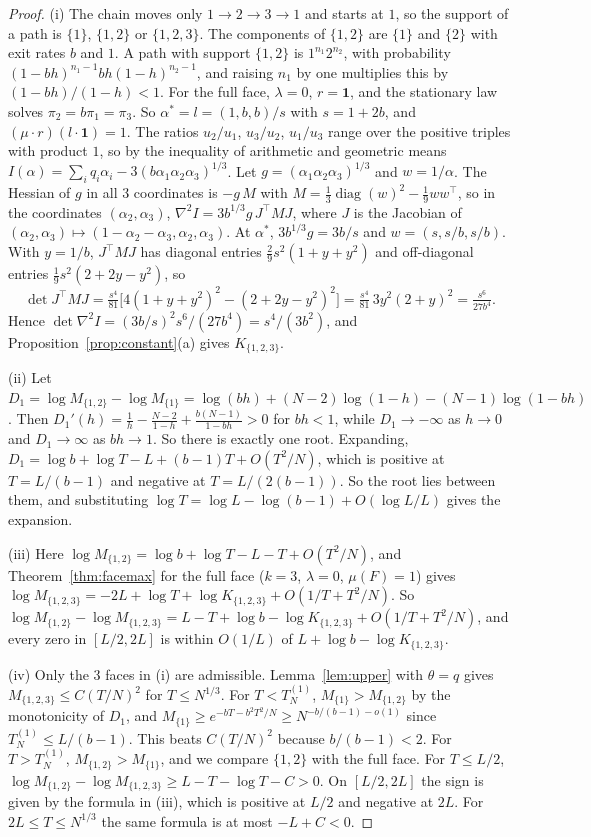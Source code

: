 \begin{proof}
(i) The chain moves only $1\to2\to3\to1$ and starts at $1$, so the support of
a path is $\{1\}$, $\{1,2\}$ or $\{1,2,3\}$. The components of $\{1,2\}$ are
$\{1\}$ and $\{2\}$ with exit rates $b$ and $1$. A path with support
$\{1,2\}$ is $1^{n_1}2^{n_2}$, with probability
$(1-bh)^{n_1-1}bh(1-h)^{n_2-1}$, and raising $n_1$ by one multiplies this by
$(1-bh)/(1-h)<1$. For the full face, $\lambda=0$, $r=\mathbf 1$, and the
stationary law solves $\pi_2=b\pi_1=\pi_3$. So $\alpha^*=l=(1,b,b)/s$ with
$s=1+2b$, and $(\mu\cdot r)(l\cdot\mathbf 1)=1$. The ratios $u_2/u_1$,
$u_3/u_2$, $u_1/u_3$ range over the positive triples with product $1$, so by
the inequality of arithmetic and geometric means
$I(\alpha)=\sum_iq_i\alpha_i-3(b\alpha_1\alpha_2\alpha_3)^{1/3}$. Let
$g=(\alpha_1\alpha_2\alpha_3)^{1/3}$ and $w=1/\alpha$. The Hessian of $g$ in
all 3 coordinates is $-g\,M$ with
$M=\frac13\operatorname{diag}(w)^2-\frac19ww^\top$, so in the coordinates
$(\alpha_2,\alpha_3)$, $\nabla^2I=3b^{1/3}g\,J^\top MJ$, where $J$ is the
Jacobian of $(\alpha_2,\alpha_3)\mapsto(1-\alpha_2-\alpha_3,\alpha_2,\alpha_3)$.
At $\alpha^*$, $3b^{1/3}g=3b/s$ and $w=(s,s/b,s/b)$. With $y=1/b$,
$J^\top MJ$ has diagonal entries $\frac29s^2(1+y+y^2)$ and off-diagonal
entries $\frac19s^2(2+2y-y^2)$, so
\[
\det J^\top MJ=\tfrac{s^4}{81}\bigl[4(1+y+y^2)^2-(2+2y-y^2)^2\bigr]
=\tfrac{s^4}{81}\,3y^2(2+y)^2=\tfrac{s^6}{27b^4}.
\]
Hence $\det\nabla^2I=(3b/s)^2s^6/(27b^4)=s^4/(3b^2)$, and
Proposition~\ref{prop:constant}(a) gives $K_{\{1,2,3\}}$.

(ii) Let $D_1=\log M_{\{1,2\}}-\log M_{\{1\}}
=\log(bh)+(N-2)\log(1-h)-(N-1)\log(1-bh)$. Then
$D_1'(h)=\frac1h-\frac{N-2}{1-h}+\frac{b(N-1)}{1-bh}>0$ for $bh<1$, while
$D_1\to-\infty$ as $h\to0$ and $D_1\to\infty$ as $bh\to1$. So there is
exactly one root. Expanding,
$D_1=\log b+\log T-L+(b-1)T+O(T^2/N)$, which is positive at $T=L/(b-1)$ and
negative at $T=L/(2(b-1))$. So the root lies between them, and substituting
$\log T=\log L-\log(b-1)+O(\log L/L)$ gives the expansion.

(iii) Here $\log M_{\{1,2\}}=\log b+\log T-L-T+O(T^2/N)$, and
Theorem~\ref{thm:facemax} for the full face ($k=3$, $\lambda=0$, $\mu(F)=1$)
gives $\log M_{\{1,2,3\}}=-2L+\log T+\log K_{\{1,2,3\}}+O(1/T+T^2/N)$. So
$\log M_{\{1,2\}}-\log M_{\{1,2,3\}}=L-T+\log b-\log K_{\{1,2,3\}}+O(1/T+T^2/N)$,
and every zero in $[L/2,2L]$ is within $O(1/L)$ of
$L+\log b-\log K_{\{1,2,3\}}$.

(iv) Only the 3 faces in (i) are admissible. Lemma~\ref{lem:upper} with
$\theta=q$ gives $M_{\{1,2,3\}}\le C(T/N)^2$ for $T\le N^{1/3}$. For
$T<T^{(1)}_N$, $M_{\{1\}}>M_{\{1,2\}}$ by the monotonicity of $D_1$, and
$M_{\{1\}}\ge e^{-bT-b^2T^2/N}\ge N^{-b/(b-1)-o(1)}$ since
$T^{(1)}_N\le L/(b-1)$. This beats $C(T/N)^2$ because $b/(b-1)<2$. For
$T>T^{(1)}_N$, $M_{\{1,2\}}>M_{\{1\}}$, and we compare $\{1,2\}$ with the full
face. For $T\le L/2$,
$\log M_{\{1,2\}}-\log M_{\{1,2,3\}}\ge L-T-\log T-C>0$. On $[L/2,2L]$ the
sign is given by the formula in (iii), which is positive at $L/2$ and
negative at $2L$. For $2L\le T\le N^{1/3}$ the same formula is at most
$-L+C<0$.
\end{proof}

